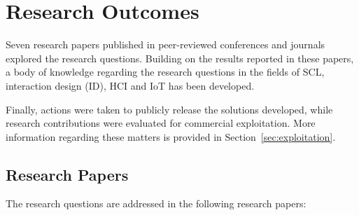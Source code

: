 \section{Research Outcomes}

Seven research papers published in peer-reviewed conferences and journals explored the research questions. Building on the results reported in these papers, a body of knowledge regarding the research questions in the fields of SCL, interaction design (ID), HCI and IoT has been developed.

Finally, actions were taken to publicly release the solutions developed, while research contributions were evaluated for commercial exploitation. More information regarding these matters is provided in Section~\ref{sec:exploitation}.


\subsection{Research Papers}
\label{sub:research-papers}

The research questions are addressed in the following research papers:

